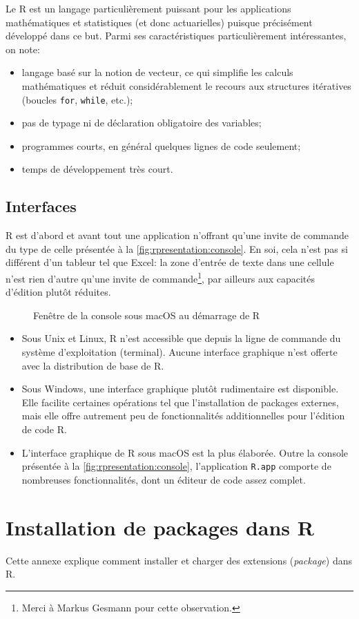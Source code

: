 \documentclass[11pt,french]{memoir}
\begin{document}
Le R est un langage particulièrement puissant pour les applications
mathématiques et statistiques (et donc actuarielles) puisque
précisément développé dans ce but. Parmi ses caractéristiques
particulièrement intéressantes, on note:
\begin{itemize}
\item langage basé sur la notion de vecteur, ce qui simplifie les
  calculs mathématiques et réduit considérablement le recours aux
  structures itératives (boucles \texttt{for}, \texttt{while}, etc.);
\item pas de typage ni de déclaration obligatoire des variables;
\item programmes courts, en général quelques lignes de code seulement;
\item temps de développement très court.
\end{itemize}



\section{Interfaces}
\label{sec:rpresentation:interfaces}

R est d'abord et avant tout une application n'offrant qu'une invite de
commande du type de celle présentée à la
\autoref{fig:rpresentation:console}. En soi, cela n'est pas si
différent d'un tableur tel que Excel: la zone d'entrée de texte dans
une cellule n'est rien d'autre qu'une invite de commande\footnote{%
  Merci à Markus Gesmann pour cette observation.}, par ailleurs aux
capacités d'édition plutôt réduites.

\begin{figure}
  \centering
  \caption{Fenêtre de la console sous macOS au démarrage de R}
  \label{fig:rpresentation:console}
\end{figure}

\begin{itemize}
\item Sous Unix et Linux, R n'est accessible que depuis la ligne de
  commande du système d'exploitation (terminal). Aucune interface
  graphique n'est offerte avec la distribution de base de R.
\item Sous Windows, une interface graphique plutôt rudimentaire est
  disponible. Elle facilite certaines opérations tel que
  l'installation de packages externes, mais elle offre autrement peu
  de fonctionnalités additionnelles pour l'édition de code R.
\item L'interface graphique de R sous macOS est la plus élaborée.
  Outre la console présentée à la
  \autoref{fig:rpresentation:console}, l'application \texttt{R.app}
  comporte de nombreuses fonctionnalités, dont un éditeur de code
  assez complet.
\end{itemize}

\appendix

\chapter{Installation de packages dans R}

Cette annexe explique comment installer et charger des extensions
(\emph{package}) dans R.
\end{document}
